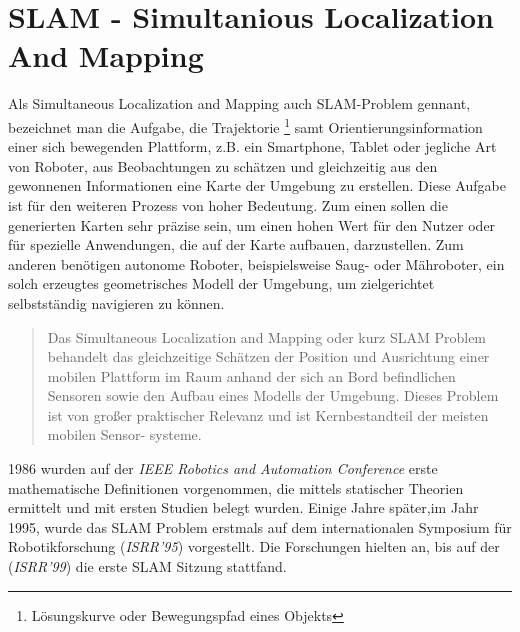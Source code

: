\section{SLAM - Simultanious Localization And Mapping}
\label{chap:SLAM}
Als Simultaneous Localization and Mapping auch \acs{SLAM}-Problem gennant, bezeichnet man die Aufgabe, die Trajektorie \footnote{Lösungskurve oder Bewegungspfad eines Objekts} 
samt Orientierungsinformation einer sich bewegenden Plattform, z.B. ein Smartphone, Tablet oder jegliche Art von Roboter, aus 
Beobachtungen zu schätzen und gleichzeitig aus den gewonnenen Informationen eine Karte der Umgebung zu erstellen.
Diese Aufgabe ist für den weiteren Prozess von hoher Bedeutung. Zum einen sollen die generierten Karten sehr präzise sein, um einen hohen 
Wert für den Nutzer oder für spezielle Anwendungen, die auf der Karte aufbauen, darzustellen. Zum anderen benötigen autonome Roboter, 
beispielsweise Saug- oder Mähroboter, ein solch erzeugtes geometrisches Modell der Umgebung, um zielgerichtet selbstständig navigieren zu 
können. %
\begin{quote}
    Das Simultaneous Localization and Mapping oder kurz SLAM Problem behandelt das gleichzeitige Schätzen der Position und Ausrichtung einer 
    mobilen Plattform im Raum anhand der sich an Bord befindlichen Sensoren sowie den Aufbau eines Modells der Umgebung. Dieses Problem ist 
    von großer praktischer Relevanz und ist Kernbestandteil der meisten mobilen Sensor- systeme. \cite{slamdefi.2016a}
\end{quote}
1986 wurden auf der \textit{IEEE Robotics and Automation Conference} erste mathematische Definitionen vorgenommen, die mittels statischer 
Theorien ermittelt und mit ersten Studien belegt wurden. Einige Jahre später,im Jahr 1995, wurde das \acs{SLAM} Problem erstmals auf dem 
internationalen Symposium für Robotikforschung (\textit{ISRR'95}) vorgestellt. Die Forschungen hielten an, bis auf der (\textit{ISRR'99}) 
die erste \acs{SLAM} Sitzung stattfand. 
